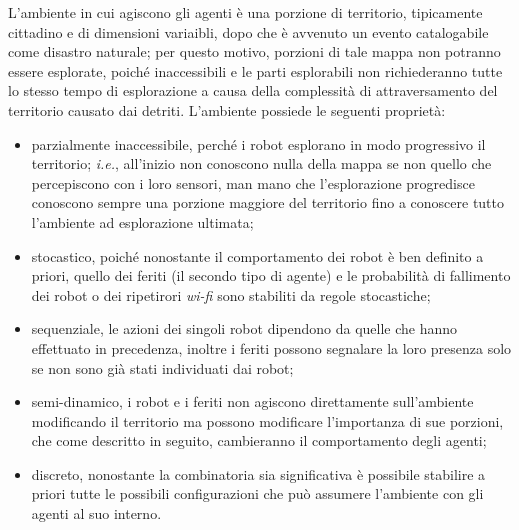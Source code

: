 L'ambiente in cui agiscono gli agenti è una porzione di territorio, tipicamente cittadino e di dimensioni variaibli, dopo che è avvenuto un evento catalogabile come disastro naturale; per questo motivo, porzioni di tale mappa non potranno essere esplorate, poiché inaccessibili e le parti esplorabili non richiederanno tutte lo stesso tempo di esplorazione a causa della complessità di attraversamento del territorio causato dai detriti.
L'ambiente possiede le seguenti proprietà:
\begin{itemize}
	\item parzialmente inaccessibile, perché i robot esplorano in modo progressivo il territorio; \textit{i.e.}, all'inizio non conoscono nulla della mappa se non quello che percepiscono con i loro sensori, man mano che l'esplorazione progredisce conoscono sempre una porzione maggiore del territorio fino a conoscere tutto l'ambiente ad esplorazione ultimata;
	\item stocastico, poiché nonostante il comportamento dei robot è ben definito a priori, quello dei feriti (il secondo tipo di agente) e le probabilità di fallimento dei robot o dei ripetirori \textit{wi-fi} sono stabiliti da regole stocastiche;
	\item sequenziale, le azioni dei singoli robot dipendono da quelle che hanno effettuato in precedenza, inoltre i feriti possono segnalare la loro presenza solo se non sono già stati individuati dai robot;
	\item semi-dinamico, i robot e i feriti non agiscono direttamente sull'ambiente modificando il territorio ma possono modificare l'importanza di sue porzioni, che come descritto in seguito, cambieranno il comportamento degli agenti;
	\item discreto, nonostante la combinatoria sia significativa è possibile stabilire a priori tutte le possibili configurazioni che può assumere l'ambiente con gli agenti al suo interno.
\end{itemize}

